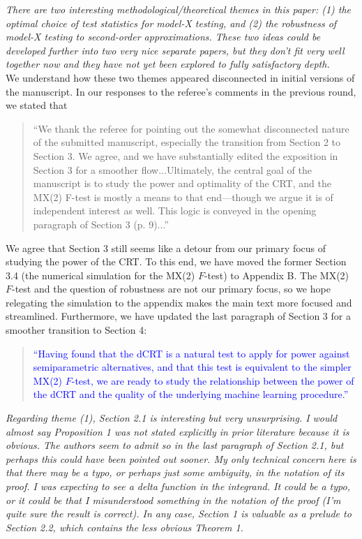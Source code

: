 \documentclass[12pt]{article}
\begin{document}
\textsl{There are two interesting methodological/theoretical themes in this paper: (1) the optimal choice of test statistics for  model-X testing, and (2) the robustness of model-X testing to second-order approximations. These two ideas could be developed further into two very nice separate papers, but they don’t fit very well together now and they have not yet been explored to fully satisfactory depth.}
\\

\noindent We understand how these two themes appeared disconnected in initial versions of the manuscript. In our responses to the referee's comments in the previous round, we stated that 

\begin{quote}
``We thank the referee for pointing out the somewhat disconnected nature of the submitted manuscript, especially the transition from Section 2 to Section 3. We agree, and we have substantially edited the exposition in Section 3 for a smoother flow...Ultimately, the central goal of the manuscript is to study the power and optimality of the CRT, and the MX(2) F-test is mostly a means to that end---though we argue it is of independent interest as well. This logic is conveyed in the opening paragraph of Section 3 (p. 9)...''
\end{quote}

\noindent We agree that Section 3 still seems like a detour from our primary focus of studying the power of the CRT. To this end, we have moved the former Section 3.4 (the numerical simulation for the MX(2) $F$-test) to Appendix B. The MX(2) $F$-test and the question of robustness are not our primary focus, so we hope relegating the simulation to the appendix makes the main text more focused and streamlined. Furthermore, we have updated the last paragraph of Section 3 for a smoother transition to Section 4:

\begin{quote}
	\textcolor{blue}{``Having found that the dCRT is a natural test to apply for power against semiparametric alternatives, and that this test is equivalent to the simpler MX(2) $F$-test, we are ready to study the relationship between the power of the dCRT and the quality of the underlying machine learning procedure.''}
\end{quote}

\textsl{Regarding theme (1), Section 2.1 is interesting but very unsurprising. I would almost say Proposition  1 was not stated explicitly in prior literature because it is obvious. The authors seem to admit so in the last paragraph of Section 2.1, but perhaps this could have been pointed out sooner. My only technical concern here is that there may be a typo, or perhaps just some ambiguity, in the notation of its proof. I was expecting to see a delta function in the integrand. It could be a typo, or it could be that I misunderstood something in the notation of the proof (I’m quite sure the result is correct). In any case, Section 1 is valuable as a prelude to Section 2.2, which contains the less obvious Theorem 1.}
\\
\end{document}
